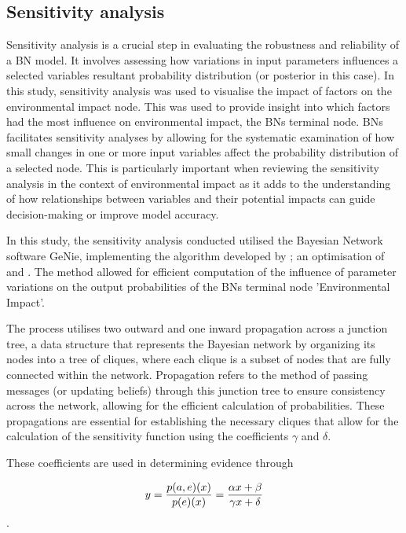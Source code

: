 \subsection{Sensitivity analysis}

Sensitivity analysis is a crucial step in evaluating the robustness and reliability of a BN model. It involves assessing how variations in input parameters influences a selected variables resultant probability distribution (or posterior in this case). In this study, sensitivity analysis was used to visualise the impact of factors on the environmental impact node. This was used to provide insight into which factors had the most influence on environmental impact, the BNs terminal node. BNs facilitates sensitivity analyses by allowing for the systematic examination of how small changes in one or more input variables affect the probability distribution of a selected node. This is particularly important when reviewing the sensitivity analysis in the context of environmental impact as it adds to the understanding of how relationships between variables and their potential impacts can guide decision-making or improve model accuracy.

In this study, the sensitivity analysis conducted utilised the Bayesian Network software GeNie, implementing the algorithm developed by \textcite{article}; an optimisation of \textcite{Castillo1996ANM} and \textcite{Gaag1998PracticableSA}. The method allowed for efficient computation of the influence of parameter variations on the output probabilities of the BNs terminal node 'Environmental Impact'.

The process utilises two outward and one inward propagation across a junction tree, a data structure that represents the Bayesian network by organizing its nodes into a tree of cliques, where each clique is a subset of nodes that are fully connected within the network. Propagation refers to the method of passing messages (or updating beliefs) through this junction tree to ensure consistency across the network, allowing for the efficient calculation of probabilities. These propagations are essential for establishing the necessary cliques that allow for the calculation of the sensitivity function using the coefficients $\gamma$ and $\delta$.

These coefficients are used in determining evidence through

\begin{equation}
y = {{p(a, e)(x)}\over{p(e)(x)}}={{\alpha x + \beta}\over{\gamma x + \delta}}
\end{equation}.


